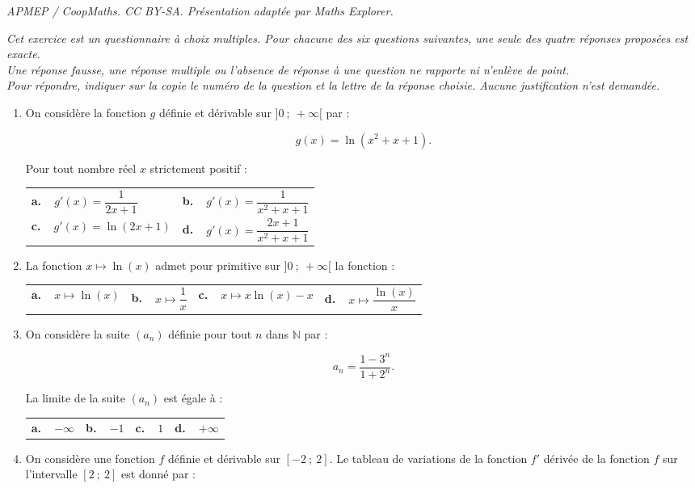\documentclass[10pt]{article}
\providecommand{\N}{\mathbb{N}}
\begin{document}
\noindent\textit{APMEP / CoopMaths. CC BY-SA. Présentation adaptée par Maths Explorer.}\par\medskip
\medskip

\emph{Cet exercice est un questionnaire à choix multiples. Pour chacune des six questions suivantes, une seule des quatre réponses proposées est exacte.\\
Une réponse fausse, une réponse multiple ou l'absence de réponse à une question ne rapporte ni n'enlève de point.\\
Pour répondre, indiquer sur la copie le numéro de la question et la lettre de la réponse choisie. Aucune justification n'est demandée.}

\medskip

\begin{enumerate}
\item On considère  la fonction $g$ définie et dérivable sur $]0~;~+ \infty[$ par :

\[g(x) = \ln \left(x^2 + x + 1\right).\]

Pour tout nombre réel $x$ strictement positif :

\begin{center}
\begin{tabularx}{\linewidth}{X X}
\textbf{a.~~}$g'(x) = \dfrac{1}{2x + 1}$&\textbf{b.~~}$g'(x) = \dfrac{1}{x^2 + x + 1}$\\[8pt]
\textbf{c.~~}$g'(x) = \ln (2x + 1)$&\textbf{d.~~}$g'(x) = \dfrac{2x + 1}{x^2 + x + 1}$
\end{tabularx}
\end{center}
\item La fonction $x \longmapsto \ln (x)$ admet pour primitive sur $]0~;~+ \infty[$ la fonction :

\begin{center}
\begin{tabularx}{\linewidth}{*{4}{X} }
\textbf{a.~~}$x \longmapsto \ln (x)$&\textbf{b.~~}$x \longmapsto \dfrac{1}{x}$&\textbf{c.~~}$x \longmapsto x \ln (x) - x$&\textbf{d.~~}$x \longmapsto \dfrac{\ln (x)}{x}$
\end{tabularx}
\end{center}
\item On considère la suite $\left(a_n\right)$ définie  pour tout $n$ dans $\N$ par :

\[a_n = \dfrac{1 - 3^n}{1 + 2^n}.\]

La limite de la suite $\left(a_n\right)$ est égale à :

\begin{center}
\begin{tabularx}{\linewidth}{*{4}{X} }
\textbf{a.~~}$- \infty$&\textbf{b.~~}$- 1$&\textbf{c.~~}$1$&\textbf{d.~~}$+ \infty$
\end{tabularx}
\end{center}
\item 
On considère une fonction $f$ définie et dérivable sur $[-2~;~2]$. Le tableau de variations de la fonction $f'$ dérivée de la fonction $f$ sur l'intervalle $[2~;~2]$ est donné par :


\end{enumerate}
\end{document}

